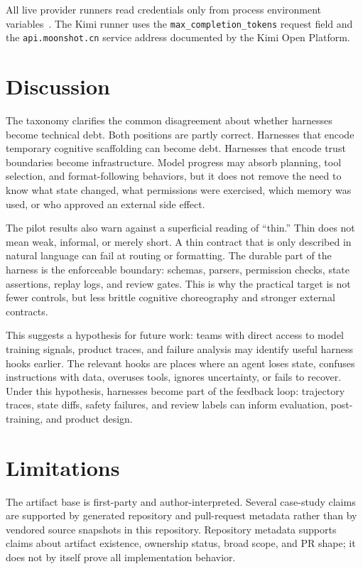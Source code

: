 \documentclass[11pt]{article}
\begin{document}
All live provider runners read credentials only from process environment variables~\cite{deepseekapi,kimiapi}. The Kimi runner uses the \texttt{max\_completion\_tokens} request field and the \texttt{api.moonshot.cn} service address documented by the Kimi Open Platform.

\section{Discussion}

The taxonomy clarifies the common disagreement about whether harnesses become technical debt. Both positions are partly correct. Harnesses that encode temporary cognitive scaffolding can become debt. Harnesses that encode trust boundaries become infrastructure. Model progress may absorb planning, tool selection, and format-following behaviors, but it does not remove the need to know what state changed, what permissions were exercised, which memory was used, or who approved an external side effect.

The pilot results also warn against a superficial reading of ``thin.'' Thin does not mean weak, informal, or merely short. A thin contract that is only described in natural language can fail at routing or formatting. The durable part of the harness is the enforceable boundary: schemas, parsers, permission checks, state assertions, replay logs, and review gates. This is why the practical target is not fewer controls, but less brittle cognitive choreography and stronger external contracts.

This suggests a hypothesis for future work: teams with direct access to model training signals, product traces, and failure analysis may identify useful harness hooks earlier. The relevant hooks are places where an agent loses state, confuses instructions with data, overuses tools, ignores uncertainty, or fails to recover. Under this hypothesis, harnesses become part of the feedback loop: trajectory traces, state diffs, safety failures, and review labels can inform evaluation, post-training, and product design.

\section{Limitations}

The artifact base is first-party and author-interpreted. Several case-study claims are supported by generated repository and pull-request metadata rather than by vendored source snapshots in this repository. Repository metadata supports claims about artifact existence, ownership status, broad scope, and PR shape; it does not by itself prove all implementation behavior.
\end{document}
